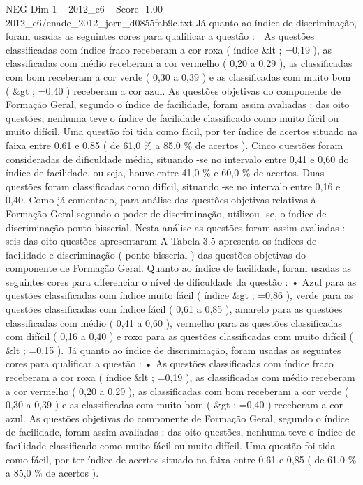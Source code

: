 \begin{textsample}{NEG Dim 1 – 2012\_c6 – Score -1.00 – 2012\_c6/enade\_2012\_jorn\_d0855fab9c.txt}
Já quanto ao índice de discriminação, foram usadas as seguintes cores para qualificar a questão :  As questões classificadas com índice fraco receberam a cor roxa ( índice \&lt ; =0,19 ), as classificadas com médio receberam a cor vermelho ( 0,20 a 0,29 ), as classificadas com bom receberam a cor verde ( 0,30 a 0,39 ) e as classificadas com muito bom ( \&gt ; =0,40 ) receberam a cor azul.
As questões objetivas do componente de Formação Geral, segundo o índice de facilidade, foram assim avaliadas : das oito questões, nenhuma teve o índice de facilidade classificado como muito fácil ou muito difícil.
Uma questão foi tida como fácil, por ter índice de acertos situado na faixa entre 0,61 e 0,85 ( de 61,0 \% a 85,0 \% de acertos ).
Cinco questões foram consideradas de dificuldade média, situando -se no intervalo entre 0,41 e 0,60 do índice de facilidade, ou seja, houve entre 41,0 \% e 60,0 \% de acertos.
Duas questões foram classificadas como difícil, situando -se no intervalo entre 0,16 e 0,40.
Como já comentado, para análise das questões objetivas relativas à Formação Geral segundo o poder de discriminação, utilizou -se, o índice de discriminação ponto bisserial.
Nesta análise as questões foram assim avaliadas : seis das oito questões apresentaram A Tabela 3.5 apresenta os índices de facilidade e discriminação ( ponto bisserial ) das questões objetivas do componente de Formação Geral.
Quanto ao índice de facilidade, foram usadas as seguintes cores para diferenciar o nível de dificuldade da questão : • Azul para as questões classificadas com índice muito fácil ( índice \&gt ; =0,86 ), verde para as questões classificadas com índice fácil ( 0,61 a 0,85 ), amarelo para as questões classificadas com médio ( 0,41 a 0,60 ), vermelho para as questões classificadas com difícil ( 0,16 a 0,40 ) e roxo para as questões classificadas com muito difícil ( \&lt ; =0,15 ).
Já quanto ao índice de discriminação, foram usadas as seguintes cores para qualificar a questão : • As questões classificadas com índice fraco receberam a cor roxa ( índice \&lt ; =0,19 ), as classificadas com médio receberam a cor vermelho ( 0,20 a 0,29 ), as classificadas com bom receberam a cor verde ( 0,30 a 0,39 ) e as classificadas com muito bom ( \&gt ; =0,40 ) receberam a cor azul.
As questões objetivas do componente de Formação Geral, segundo o índice de facilidade, foram assim avaliadas : das oito questões, nenhuma teve o índice de facilidade classificado como muito fácil ou muito difícil.
Uma questão foi tida como fácil, por ter índice de acertos situado na faixa entre 0,61 e 0,85 ( de 61,0 \% a 85,0 \% de acertos ).

\end{textsample}
